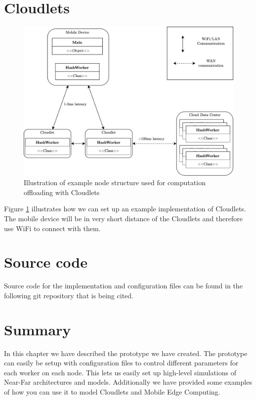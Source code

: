 
\section{Cloudlets}
\begin{figure}[t]
    \centering
    \includegraphics[scale=0.9]{chapters/5_implementation/figures/Cloudlet_implementation.png}
    \caption{Illustration of example node structure used for computation offloading with Cloudlets}
    \label{fig:Cloudlet_implementation}
\end{figure}
Figure \ref{fig:Cloudlet_implementation} illustrates how we can set up an example implementation of Cloudlets. The mobile device will be in very short distance of the Cloudlets and therefore use WiFi to connect with them.






\section{Source code}
Source code for the implementation and configuration files can be found in the following git repository that is being cited\cite{johnsen_daniejohmasterprograms_nodate}.






\section{Summary}
In this chapter we have described the prototype we have created. The prototype can easily be setup with configuration files to control different parameters for each worker on each node. This lets us easily set up high-level simulations of Near-Far architectures and models. Additionally we have provided some examples of how you can use it to model Cloudlets and Mobile Edge Computing.